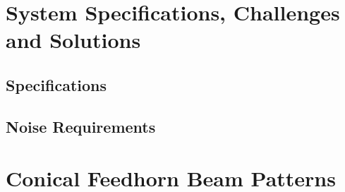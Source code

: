 \documentclass[12pt,letterpaper]{memoir}
\numberwithin{equation}{chapter}
\numberwithin{figure}{chapter}
\numberwithin{table}{chapter}
\begin{document}


\chapter{System Specifications, Challenges and Solutions}\label{c:specs}

\section{Specifications} \label{sec:ch2-specifictions}

\section{Noise Requirements} \label{sec:ch2-noise}











\appendix

\chapter{Conical Feedhorn Beam Patterns} \label{app:feedhorn-eqn}

\SingleSpacing
\printbibliography
\end{document}
